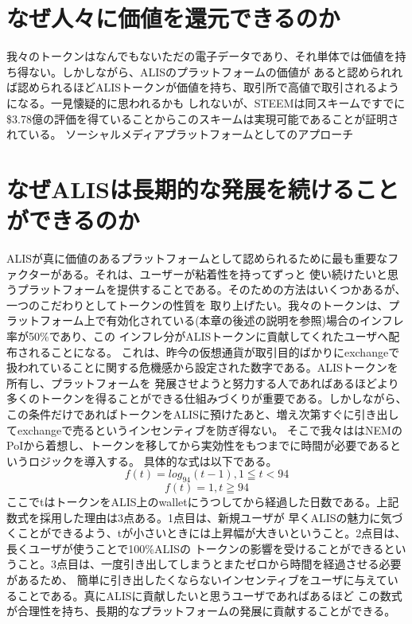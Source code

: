 \documentclass{jsarticle}
\begin{document}
\section{なぜ人々に価値を還元できるのか}
我々のトークンはなんでもないただの電子データであり、それ単体では価値を持ち得ない。しかしながら、ALISのプラットフォームの価値が
あると認められれば認められるほどALISトークンが価値を持ち、取引所で高値で取引されるようになる。一見懐疑的に思われるかも
しれないが、STEEMは同スキームですでに\$3.78億の評価を得ていることからこのスキームは実現可能であることが証明されている。
ソーシャルメディアプラットフォームとしてのアプローチ
\section{なぜALISは長期的な発展を続けることができるのか}
ALISが真に価値のあるプラットフォームとして認められるために最も重要なファクターがある。それは、ユーザーが粘着性を持ってずっと
使い続けたいと思うプラットフォームを提供することである。そのための方法はいくつかあるが、一つのこだわりとしてトークンの性質を
取り上げたい。我々のトークンは、プラットフォーム上で有効化されている(本章の後述の説明を参照)場合のインフレ率が50\%であり、この
インフレ分がALISトークンに貢献してくれたユーザへ配布されることになる。
これは、昨今の仮想通貨が取引目的ばかりにexchangeで扱われていることに関する危機感から設定された数字である。ALISトークンを所有し、プラットフォームを
発展させようと努力する人であればあるほどより多くのトークンを得ることができる仕組みづくりが重要である。しかしながら、
この条件だけであればトークンをALISに預けたあと、増え次第すぐに引き出してexchangeで売るというインセンティブを防ぎ得ない。
そこで我々ははNEMのPoIから着想し、トークンを移してから実効性をもつまでに時間が必要であるというロジックを導入する。
具体的な式は以下である。
\begin{equation}
f(t) = log_{94}(t-1) , 1 ≦ t < 94
\end{equation}
\begin{equation}
f(t) = 1 , t ≧ 94
\end{equation}
ここでtはトークンをALIS上のwalletにうつしてから経過した日数である。上記数式を採用した理由は3点ある。1点目は、新規ユーザが
早くALISの魅力に気づくことができるよう、tが小さいときには上昇幅が大きいということ。2点目は、長くユーザが使うことで100\%ALISの
トークンの影響を受けることができるということ。3点目は、一度引き出してしまうとまたゼロから時間を経過させる必要があるため、
簡単に引き出したくならないインセンティブをユーザに与えていることである。真にALISに貢献したいと思うユーザであればあるほど
この数式が合理性を持ち、長期的なプラットフォームの発展に貢献することができる。
\end{document}
